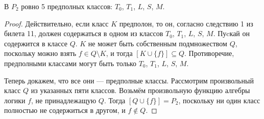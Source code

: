 \begin{theorem}
    В $P_2$ ровно 5 предполных классов: $T_0$, $T_1$, $L$, $S$, $M$.
\end{theorem}

\begin{proof}
    Действительно, если класс $K$ предполон, то он, согласно следствию 1 из билета 11, должен содержаться в одном из классов $T_0$, $T_1$, $L$, $S$, $M$. Пуcкай он содержится в классе $Q$. $K$ не может быть собственным подмножеством $Q$, поскольку можно взять $f \in Q \setminus K$, и тогда $[K\cup \{f\}] \subseteq Q$. Противоречие, предполными классами могут быть только $T_0$, $T_1$, $L$, $S$, $M$.

    Теперь докажем, что все они --- предполные классы. Рассмотрим произвольный класс $Q$ из указанных пяти классов. Возьмём произвольную функцию алгебры логики $f$, не принадлежащую $Q$. Тогда $[Q \cup\{f\}] = P_2$, поскольку ни один класс полностью не содержиться в другом, и $f \notin Q$.
\end{proof}
